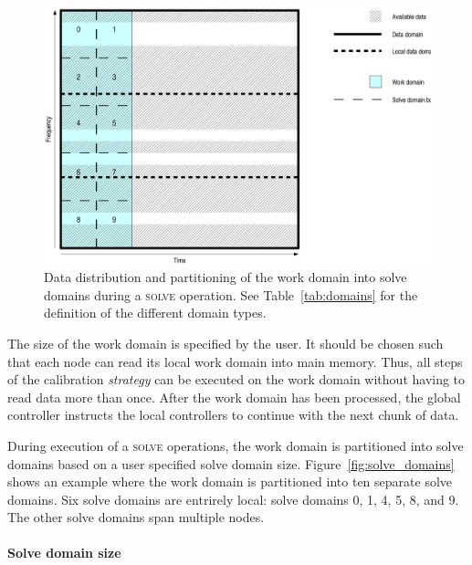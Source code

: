 \documentclass[10pt]{lofar}
\newcommand{\solve}{\textsc{solve}\xspace}
\begin{document}
\begin{figure}[htbp]
\centering
\includegraphics[scale=0.5]{images/solve_domains.ps}
\caption{Data distribution and partitioning of the work domain into solve
domains during a \solve operation. See Table~\ref{tab:domains} for the definition
of the different domain types.}
\label{fig:domains}
\end{figure}

The size of the work domain is specified by the user. It should be chosen such
that each node can read its local work domain into main memory. Thus, all steps
of the calibration \emph{strategy} can be executed on the work domain without
having to read data more than once. After the work domain has been processed,
the global controller instructs the local controllers to continue with the next
chunk of data.

During execution of a \solve operations, the work domain is partitioned into
solve domains based on a user specified solve domain size.
Figure~\ref{fig:solve_domains} shows an example where the work domain is
partitioned into ten separate solve domains. Six solve domains are entrirely
local: solve domains 0, 1, 4, 5, 8, and 9. The other solve domains span multiple
nodes.


\paragraph{Solve domain size}
\end{document}
